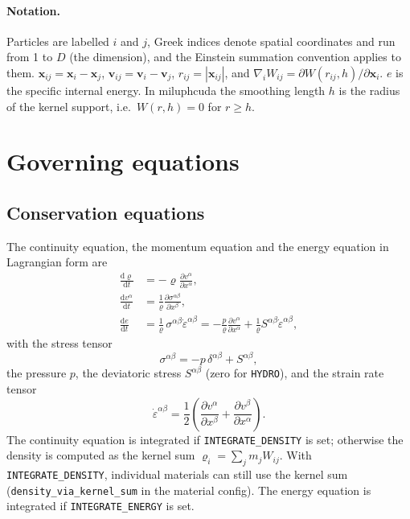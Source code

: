 \documentclass[10pt,fleqn,twoside]{article}
\renewcommand{\vec}[1]{{\mathbf #1}}
\newcommand{\code}[1]{\texttt{#1}}
\newcommand{\sw}[1]{\texttt{#1}}
\newcommand{\dd}{\mathrm{d}}
\newcommand{\gradW}{\nabla_{\!i} W_{ij}}
\begin{document}
\paragraph{Notation.} Particles are labelled $i$ and $j$, Greek indices denote spatial coordinates and run from 1 to
$D$ (the dimension), and the Einstein summation convention applies to them. $\vec x_{ij} = \vec x_i - \vec x_j$,
$\vec v_{ij} = \vec v_i - \vec v_j$, $r_{ij} = |\vec x_{ij}|$, and $\gradW = \partial W(r_{ij}, h)/\partial
\vec x_i$. $e$ is the specific internal energy. In miluphcuda the smoothing length $h$ is the radius of the kernel
support, i.e.\ $W(r, h) = 0$ for $r \geq h$.


\section{Governing equations}

\subsection{Conservation equations}
The continuity equation, the momentum equation and the energy equation in Lagrangian form are
\begin{align}
 \frac{\dd \varrho}{\dd t} &= - \varrho \frac{\partial v^\alpha}{\partial x^\alpha}, \label{eq:continuity}\\
 \frac{\dd v^\alpha}{\dd t} &= \frac{1}{\varrho}\frac{\partial \sigma^{\alpha\beta}}{\partial x^\beta},
  \label{eq:momentum}\\
 \frac{\dd e}{\dd t} &= \frac{1}{\varrho}\,\sigma^{\alpha\beta}\dot\varepsilon^{\alpha\beta}
  = -\frac{p}{\varrho}\frac{\partial v^\alpha}{\partial x^\alpha}
    + \frac{1}{\varrho} S^{\alpha\beta}\dot\varepsilon^{\alpha\beta}, \label{eq:energy}
\end{align}
with the stress tensor
\begin{equation}
 \sigma^{\alpha\beta} = -p\,\delta^{\alpha\beta} + S^{\alpha\beta},
\end{equation}
the pressure $p$, the deviatoric stress $S^{\alpha\beta}$ (zero for \sw{HYDRO}), and the strain rate tensor
\begin{equation}
 \dot\varepsilon^{\alpha\beta} = \frac{1}{2}\left(\frac{\partial v^\alpha}{\partial x^\beta}
  + \frac{\partial v^\beta}{\partial x^\alpha}\right).
\end{equation}
The continuity equation is integrated if \sw{INTEGRATE\_DENSITY} is set; otherwise the density is computed as the
kernel sum $\varrho_i = \sum_j m_j W_{ij}$. With \sw{INTEGRATE\_DENSITY}, individual materials can still use the
kernel sum (\code{density\_via\_kernel\_sum} in the material config). The energy equation is integrated if
\sw{INTEGRATE\_ENERGY} is set.
\end{document}
